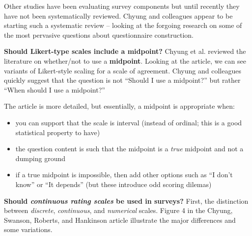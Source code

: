\documentclass[
  english,
]{book}
\providecommand{\tightlist}{%
  \setlength{\itemsep}{0pt}\setlength{\parskip}{0pt}}
\begin{document}
Other studies have been evaluating survey components but until recently they have not been systematically reviewed. Chyung and colleagues appear to be starting such a systematic review -- looking at the forgoing research on some of the most pervasive questions about questionnaire construction.

\textbf{Should Likert-type scales include a midpoint?} Chyung et al. \citeyearpar{chyung_evidence-based_2017} reviewed the literature on whether/not to use a \textbf{midpoint}. Looking at the article, we can see variants of Likert-style scaling for a scale of agreement. Chyung and colleagues quickly suggest that the question is not ``Should I use a midpoint?'' but rather ``When should I use a midpoint?''

The article is more detailed, but essentially, a midpoint is appropriate when:

\begin{itemize}
\tightlist
\item
  you can support that the scale is interval (instead of ordinal; this is a good statistical property to have)
\item
  the question content is such that the midpoint is a \emph{true} midpoint and not a dumping ground
\item
  if a true midpoint is impossible, then add other options such as ``I don't know'' or ``It depends'' (but these introduce odd scoring dilemas)
\end{itemize}

\textbf{Should \emph{continuous rating scales} be used in surveys?} First, the distinction between \emph{discrete}, \emph{continuous}, and \emph{numerical} scales. Figure 4 in the Chyung, Swanson, Roberts, and Hankinson \citeyearpar{chyung_evidencebased_2018-1} article illustrate the major differences and some variations.
\end{document}
